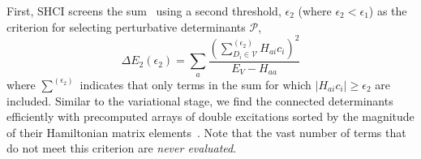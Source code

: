 \documentclass[%
reprint,
 superscriptaddress,
 amsmath,amssymb,
 aps,
]{revtex4-1}
\def\V{\mathcal{V}}
\def\P{\mathcal{P}}
\begin{document}
First, SHCI screens the sum~\cite{HolTubUmr-JCTC-16} using a second threshold, $\epsilon_2$ (where $\epsilon_2<\epsilon_1$) as the criterion for selecting perturbative determinants $\P$,
\begin{equation}
\Delta E_{2} \left(\epsilon_{2}\right) = \sum_a \frac{\left(\sum_{D_i \in \V}^{(\epsilon_{2})}  H_{a i} c_{i}\right) ^{2}}{E_{V} - H_{a a}}
\label{eq:PTb}
\end{equation}
where $\sum^{(\epsilon_{2})}$ indicates that only terms in the sum for which $\left|H_{a i} c_{i}\right| \ge \epsilon_{2}$ are included.
Similar to the variational stage, we find the connected determinants efficiently with precomputed arrays of
double excitations sorted by the magnitude of their Hamiltonian matrix elements~\cite{HolTubUmr-JCTC-16}.
Note that the vast number of terms that do not meet this criterion are \emph{never evaluated}.
\end{document}
